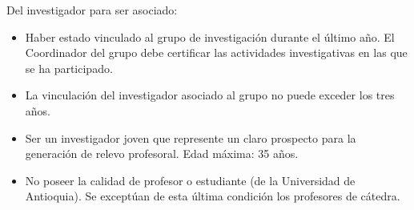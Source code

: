 \documentclass[11pt]{article}
\begin{document}











\begin{instrucciones}
  Del investigador para ser asociado:
  \begin{itemize}
  \item  Haber estado vinculado al grupo de investigación durante el último año. El Coordinador del grupo debe certificar las actividades investigativas en las que se ha participado.

  \item La vinculación del investigador asociado al grupo no puede exceder los tres años.

  \item Ser un investigador joven que represente un claro prospecto para la generación de relevo profesoral. Edad máxima: 35 años.

  \item No poseer la calidad de profesor o estudiante (de la Universidad de Antioquia). Se exceptúan de esta última condición los profesores de cátedra.
  \end{itemize}
\end{instrucciones}
\end{document}
